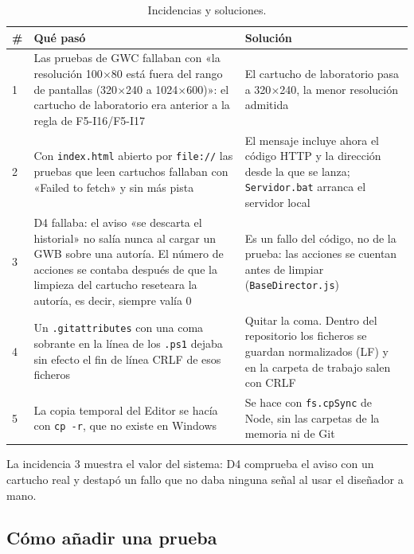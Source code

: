\begin{table}[H]
	\centering
	\begin{tabularx}{\textwidth}{l >{\RaggedRight\arraybackslash}X >{\RaggedRight\arraybackslash}X}
		\toprule
		\textbf{\#} & \textbf{Qué pasó} & \textbf{Solución} \\
		\midrule
		1 & Las pruebas de GWC fallaban con «la resolución 100$\times$80 está fuera del rango de pantallas (320$\times$240 a 1024$\times$600)»: el cartucho de laboratorio era anterior a la regla de F5-I16/F5-I17 & El cartucho de laboratorio pasa a 320$\times$240, la menor resolución admitida \\
		2 & Con \texttt{index.html} abierto por \texttt{file://} las pruebas que leen cartuchos fallaban con «Failed to fetch» y sin más pista & El mensaje incluye ahora el código HTTP y la dirección desde la que se lanza; \texttt{Servidor.bat} arranca el servidor local \\
		3 & D4 fallaba: el aviso «se descarta el historial» no salía nunca al cargar un GWB sobre una autoría. El número de acciones se contaba después de que la limpieza del cartucho reseteara la autoría, es decir, siempre valía 0 & Es un fallo del código, no de la prueba: las acciones se cuentan antes de limpiar (\texttt{BaseDirector.js}) \\
		4 & Un \texttt{.gitattributes} con una coma sobrante en la línea de los \texttt{.ps1} dejaba sin efecto el fin de línea CRLF de esos ficheros & Quitar la coma. Dentro del repositorio los ficheros se guardan normalizados (LF) y en la carpeta de trabajo salen con CRLF \\
		5 & La copia temporal del Editor se hacía con \texttt{cp -r}, que no existe en Windows & Se hace con \texttt{fs.cpSync} de Node, sin las carpetas de la memoria ni de Git \\
		\bottomrule
	\end{tabularx}
	\caption{Incidencias y soluciones.}
\end{table}

La incidencia 3 muestra el valor del sistema: D4 comprueba el aviso con un cartucho real y destapó un fallo que no daba ninguna señal al usar el diseñador a mano.

\subsection{Cómo añadir una prueba}
\label{sec:F5I18Nueva}

